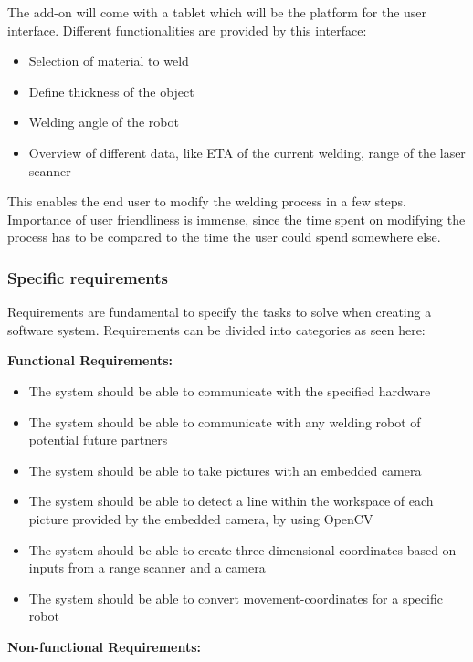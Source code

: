 The add-on will come with a tablet which will be the platform for the user interface. Different functionalities are provided by this interface: 

\begin{itemize}

\item Selection of material to weld 
\item Define thickness of the object
\item Welding angle of the robot
\item Overview of different data, like ETA of the current welding, range of the laser scanner

\end{itemize}

This enables the end user to modify the welding process in a few steps. Importance of user friendliness is immense, since the time spent on modifying the process has to be compared to the time the user could spend somewhere else.

\subsubsection{Specific requirements}
Requirements are fundamental to specify the tasks to solve when creating a software system. Requirements can be divided into categories as seen here:

\textbf{Functional Requirements:}
\begin{itemize}

\item The system should be able to communicate with the specified hardware
\item The system should be able to communicate with any welding robot of potential future partners
\item The system should be able to take pictures with an embedded camera 
\item The system should be able to detect a line within the workspace of each picture provided by the embedded camera, by using OpenCV
\item The system should be able to create three dimensional coordinates based on inputs from a range scanner and a camera
\item The system should be able to convert movement-coordinates for a specific robot

\end{itemize}

\textbf{Non-functional Requirements:}

